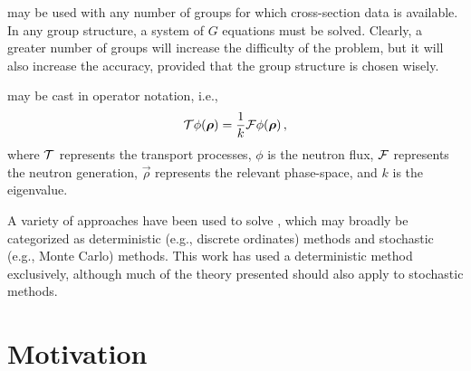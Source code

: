  may be used with any number of groups for which 
cross-section data is available.  In any group structure, a system of $G$ equations 
must be solved.  Clearly, a greater number of groups will increase the 
difficulty of the problem, but it will 
also increase the accuracy, provided that the group structure is chosen wisely. 
 

 may be cast in operator notation, i.e.,
\begin{equation}
    \oper{T} \phi(\vec{\rho}) = \frac{1}{k} \oper{F} \phi(\vec{\rho}) 
    \, , 
    \label{eq:fundamentaleq}
\end{equation}
where $\mathcal{T}$ represents the transport processes, $\phi$ is the neutron 
flux, $\mathcal{F}$ represents the neutron generation, $\vec{\rho}$ represents the 
relevant phase-space, and $k$ is the eigenvalue.

A variety of approaches have been used to solve , which 
may broadly be categorized as deterministic (e.g., discrete ordinates) methods 
and stochastic (e.g., Monte Carlo) methods.  This work has 
used a deterministic method exclusively, although much of the theory presented 
should also apply to stochastic methods. 

\section{Motivation}

